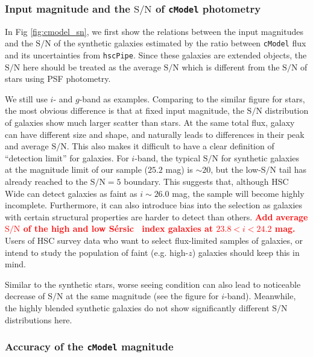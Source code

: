 \documentclass[useamsfonts]{pasj01}
\def\ser{{S\'{e}rsic\ }}
\def\hscpipe{\texttt{hscPipe}}
\def\cmodel{\texttt{cModel}}
\def\s2n{{$\mathrm{S}/\mathrm{N}$}}
\newcommand{\todo}[1]{\textcolor{red} {\textbf{#1}}}
\begin{document}
\subsubsection{Input magnitude and the \s2n{} of \cmodel{} photometry}

    In Fig \ref{fig:cmodel_sn}, we first show the relations between the input 
    magnitudes and the \s2n{} of the synthetic galaxies estimated by the ratio 
    between \cmodel{} flux and its uncertainties from \hscpipe{}. 
    Since these galaxies are extended objects, the \s2n{} here should be treated 
    as the average \s2n{} which is different from the \s2n{} of stars using PSF 
    photometry. 
    
    We still use $i$- and $g$-band as examples. 
    Comparing to the similar figure for stars, the most obvious difference is that
    at fixed input magnitude, the \s2n{} distribution of galaxies show much larger
    scatter than stars.  
    At the same total flux, galaxy can have different size and shape, and 
    naturally leads to differences in their peak and average \s2n{}.  
    This also makes it difficult to have a clear definition of ``detection limit'' 
    for galaxies. 
    For $i$-band, the typical \s2n{} for synthetic galaxies at the magnitude limit 
    of our sample ($25.2$ mag) is ${\sim}20$, but the low-\s2n{} tail has already 
    reached to the \s2n{}$=5$ boundary.  
    This suggests that, although HSC Wide can detect galaxies as faint as 
    $i{\sim}26.0$ mag, the sample will become highly incomplete. 
    Furthermore, it can also introduce bias into the selection as galaxies with 
    certain structural properties are harder to detect than others. 
    \todo{Add average \s2n{} of the high and low \ser{} index galaxies at 
    $23.8 < i < 24.2$ mag.}
    Users of HSC survey data who want to select flux-limited samples of galaxies,
    or intend to study the population of faint (e.g. high-$z$) galaxies should
    keep this in mind.  
    
    Similar to the synthetic stars, worse seeing condition can also lead to 
    noticeable decrease of \s2n{} at the same magnitude (see the figure for
    $i$-band). 
    Meanwhile, the highly blended synthetic galaxies do not show significantly 
    different \s2n{} distributions here. 

\subsubsection{Accuracy of the \cmodel{} magnitude}
\end{document}
